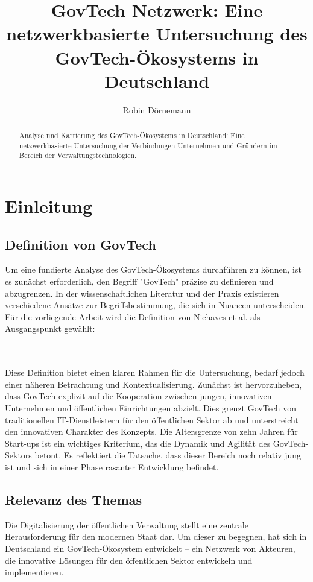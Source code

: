 \documentclass[a4paper,11pt]{article}
\title{GovTech Netzwerk: Eine netzwerkbasierte Untersuchung des GovTech-Ökosystems in Deutschland}
\author{Robin Dörnemann}
\date{}
\begin{document}
\maketitle

\begin{abstract}
Analyse und Kartierung des GovTech-Ökosystems in Deutschland: Eine netzwerkbasierte Untersuchung der Verbindungen Unternehmen und Gründern im Bereich der Verwaltungstechnologien.
\end{abstract}

\tableofcontents

\section{Einleitung}
\subsection{Definition von GovTech}
Um eine fundierte Analyse des GovTech-Ökosystems durchführen zu können, ist es zunächst erforderlich, den Begriff "GovTech" präzise zu definieren und abzugrenzen. In der wissenschaftlichen Literatur und der Praxis existieren verschiedene Ansätze zur Begriffsbestimmung, die sich in Nuancen unterscheiden. Für die vorliegende Arbeit wird die Definition von Niehaves et al. als Ausgangspunkt gewählt:

\\ \parencite{Niehaves2024}\\ 

Diese Definition bietet einen klaren Rahmen für die Untersuchung, bedarf jedoch einer näheren Betrachtung und Kontextualisierung. Zunächst ist hervorzuheben, dass GovTech explizit auf die Kooperation zwischen jungen, innovativen Unternehmen und öffentlichen Einrichtungen abzielt. Dies grenzt GovTech von traditionellen IT-Dienstleistern für den öffentlichen Sektor ab und unterstreicht den innovativen Charakter des Konzepts. Die Altersgrenze von zehn Jahren für Start-ups ist ein wichtiges Kriterium, das die Dynamik und Agilität des GovTech-Sektors betont. Es reflektiert die Tatsache, dass dieser Bereich noch relativ jung ist und sich in einer Phase rasanter Entwicklung befindet.


\subsection{Relevanz des Themas}
Die Digitalisierung der öffentlichen Verwaltung stellt eine zentrale Herausforderung für den modernen Staat dar. Um dieser zu begegnen, hat sich in Deutschland ein GovTech-Ökosystem entwickelt – ein Netzwerk von Akteuren, die innovative Lösungen für den öffentlichen Sektor entwickeln und implementieren. 
\end{document}
